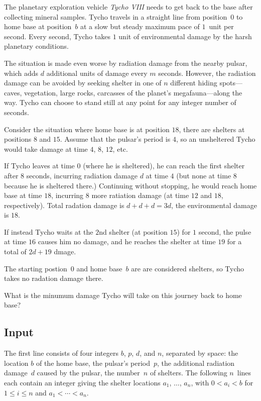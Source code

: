 
The planetary exploration vehicle \emph{Tycho VIII} needs to get back to the base after collecting mineral samples.
Tycho travels in a straight line from position~$0$ to home base at position~$b$ at a slow but steady maximum pace of $1$~unit per second.
Every second, Tycho takes $1$ unit of environmental damage by the harsh planetary conditions.

The situation is made even worse by radiation damage from the nearby pulsar, which adds $d$ additional units of damage every $m$ seconds.
However, the radiation damage can be avoided by seeking shelter in one of $n$ different hiding spots---caves, vegetation, large rocks, carcasses of the planet's megafauna---along the way.
Tycho can choose to stand still at any point for any integer number of seconds.

Consider the situation where home base is at position $18$, there are shelters at positions $8$ and $15$.
Assume that the pulsar's period is $4$, so an unsheltered Tycho would take damage at time $4$, $8$, $12$, etc.

If Tycho leaves at time $0$ (where he is sheltered), he can reach the first shelter after $8$ seconds, incurring radiation damage $d$ at time $4$ (but none at time $8$ because he is sheltered there.)
Continuing without stopping, he would reach home base at time $18$, incurring $8$ more ratiation damage (at time $12$ and $18$, respectively).
Total radation damage is $d+d+d=3d$, the environmental damage is $18$.

If instead Tycho waits at the $2$nd shelter (at position $15$) for $1$ second, the pulse at time $16$ causes him no damage, and he reaches the shelter at time $19$ for a total of $2d + 19$ dmage.

The starting postion~$0$ and home base~$b$ are are considered shelters, so Tycho takes no radation damage there.

\medskip
What is the minumum damage Tycho will take on this journey back to home base?

\subsection*{Input}

The first line consists of four integers $b$, $p$, $d$, and $n$, separated by space:
the location $b$ of the home base,
the pulsar's period~$p$,
the additional radiation damage~$d$ caused by the pulsar,
the number~$n$ of shelters.
The following $n$~lines each contain an integer giving the shelter locations $a_1$, $\ldots$, $a_n$, with 
$0<a_i< b$ for $1\leq i \leq n$ %
and 
$a_1<\cdots <a_n$. %

